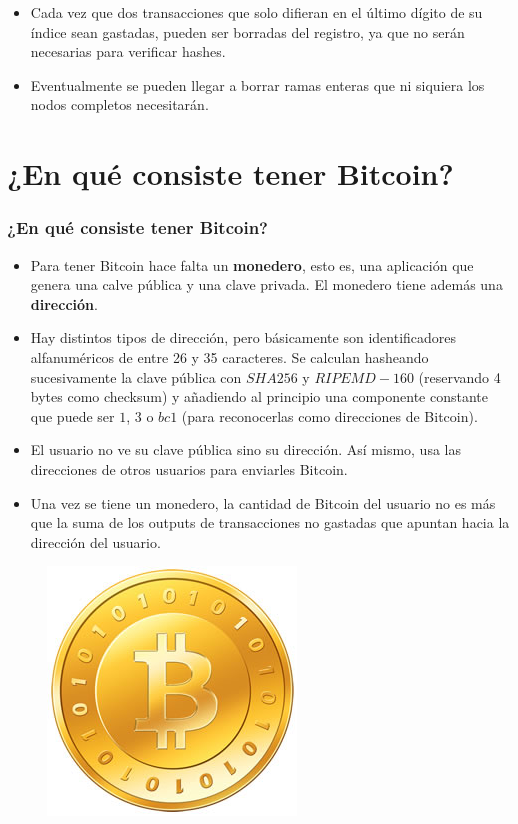 \documentclass{beamer}
\theoremstyle{definition}
\begin{document}
\begin{frame}
	\begin{itemize}
		\item Cada vez que dos transacciones que solo difieran en el último dígito de su índice sean gastadas, pueden ser borradas del registro, ya que no serán necesarias para verificar hashes.
		\item Eventualmente se pueden llegar a borrar ramas enteras que ni siquiera los nodos completos necesitarán.
	\end{itemize}
\end{frame}

\section{¿En qué consiste tener Bitcoin?}
\begin{frame}
	\frametitle{¿En qué consiste tener Bitcoin?}
	\begin{itemize}
		\item<1-> Para tener Bitcoin hace falta un \textbf{monedero}, esto es, una aplicación que genera una calve pública y una clave privada. El monedero tiene además una \textbf{dirección}. 
		\item<2-> Hay distintos tipos de dirección, pero básicamente son identificadores alfanuméricos de entre 26 y 35 caracteres. Se calculan hasheando sucesivamente la clave pública con $SHA256$ y $RIPEMD-160$ (reservando 4 bytes como checksum) y añadiendo al principio una componente constante que puede ser $1$, $3$ o $bc1$ (para reconocerlas como direcciones de Bitcoin). 
	\end{itemize}
\end{frame}

\begin{frame}
	\begin{itemize}
		\item<1-> El usuario no ve su clave pública sino su dirección. Así mismo, usa las direcciones de otros usuarios para enviarles Bitcoin.
		\item<2-> Una vez se tiene un monedero, la cantidad de Bitcoin del usuario no es más que la suma de los outputs de transacciones no gastadas que apuntan hacia la dirección del usuario.
	\end{itemize}
\end{frame}

\begin{frame}
	\begin{figure}
	\includegraphics[scale=0.7]{bitcoin}
\end{figure}
\end{frame}
\end{document}
